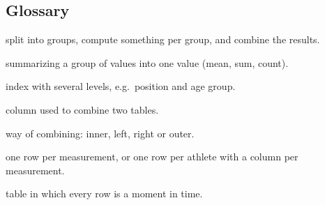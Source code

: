\documentclass[11pt,a4paper]{article}
\begin{document}
\subsection*{Glossary}

\begin{description}[leftmargin=3.2cm, labelwidth=3.0cm, font=\normalfont\bfseries]
  \item[groupby] split into groups, compute something per group, and combine the results.
  \item[aggregation] summarizing a group of values into one value (mean, sum, count).
  \item[MultiIndex] index with several levels, e.g.\ position and age group.
  \item[key] column used to combine two tables.
  \item[join] way of combining: inner, left, right or outer.
  \item[long / wide] one row per measurement, or one row per athlete with a column per measurement.
  \item[time series] table in which every row is a moment in time.
\end{description}
\end{document}
